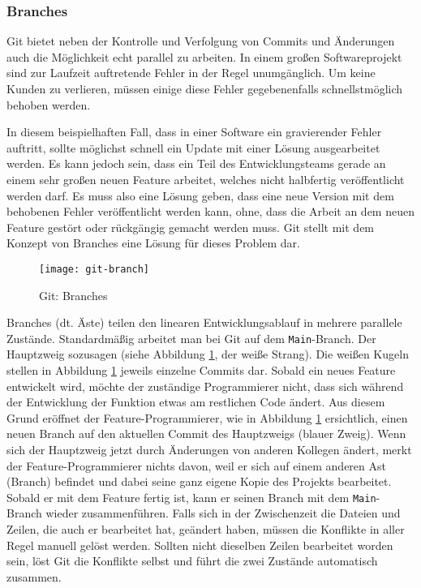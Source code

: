 \subsubsection{Branches}
Git bietet neben der Kontrolle und Verfolgung von Commits und Änderungen auch
die Möglichkeit echt parallel zu arbeiten. In einem großen Softwareprojekt sind
zur Laufzeit auftretende Fehler in der Regel unumgänglich. Um keine Kunden zu
verlieren, müssen einige diese Fehler gegebenenfalls schnellstmöglich behoben
werden.

In diesem beispielhaften Fall, dass in einer Software ein gravierender Fehler
auftritt, sollte möglichst schnell ein Update mit einer Lösung ausgearbeitet
werden. Es kann jedoch sein, dass ein Teil des Entwicklungsteams gerade an einem
sehr großen neuen Feature arbeitet, welches nicht halbfertig veröffentlicht
werden darf. Es muss also eine Lösung geben, dass eine neue Version mit dem
behobenen Fehler veröffentlicht werden kann, ohne, dass die Arbeit an dem neuen
Feature gestört oder rückgängig gemacht werden muss. Git stellt mit dem Konzept
von Branches eine Lösung für dieses Problem dar.

\begin{figure}[h]
    \centering
    \texttt{[image: git-branch]}
    \caption{Git: Branches}
    \label{fig:git-branch}
\end{figure}

Branches (dt. Äste) teilen den linearen Entwicklungsablauf in mehrere parallele
Zustände. Standardmäßig arbeitet man bei Git auf dem \texttt{Main}-Branch. Der
Hauptzweig sozusagen (siehe Abbildung \ref{fig:git-branch}, der weiße Strang).
Die weißen Kugeln stellen in Abbildung \ref{fig:git-branch} jeweils einzelne
Commits dar. Sobald ein neues Feature entwickelt wird, möchte der zuständige
Programmierer nicht, dass sich während der Entwicklung der Funktion etwas am
restlichen Code ändert. Aus diesem Grund eröffnet der Feature-Programmierer, wie
in Abbildung \ref{fig:git-branch} ersichtlich, einen neuen Branch auf den
aktuellen Commit des Hauptzweigs (blauer Zweig). Wenn sich der Hauptzweig jetzt
durch Änderungen von anderen Kollegen ändert, merkt der Feature-Programmierer
nichts davon, weil er sich auf einem anderen Ast (Branch) befindet und dabei
seine ganz eigene Kopie des Projekts bearbeitet. Sobald er mit dem Feature
fertig ist, kann er seinen Branch mit dem \texttt{Main}-Branch wieder
zusammenführen. Falls sich in der Zwischenzeit die Dateien und Zeilen, die auch
er bearbeitet hat, geändert haben, müssen die Konflikte in aller Regel manuell
gelöst werden. Sollten nicht dieselben Zeilen bearbeitet worden sein, löst Git
die Konflikte selbst und führt die zwei Zustände automatisch zusammen.

